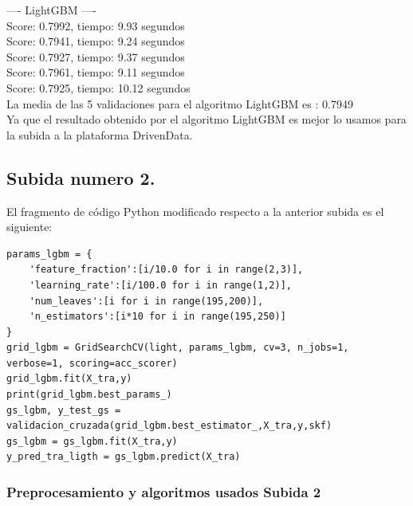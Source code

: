 	---- LightGBM ----					    \\		
	Score: 0.7992, tiempo:   9.93 segundos  \\
	Score: 0.7941, tiempo:   9.24 segundos  \\
	Score: 0.7927, tiempo:   9.37 segundos  \\
	Score: 0.7961, tiempo:   9.11 segundos  \\
	Score: 0.7925, tiempo:  10.12 segundos  \\
	
	La media de las 5 validaciones para el algoritmo LightGBM es : 0.7949 \\
	
	Ya que el resultado obtenido por el algoritmo LightGBM es mejor lo usamos para la subida a la plataforma DrivenData.
	
	
	\subsection[Subida numero 2]{Subida numero 2.}
	
	El fragmento de código Python modificado respecto a la anterior subida es el siguiente:
	
	\lstset{language=python}
	\begin{lstlisting}[frame=single]
params_lgbm = {
	'feature_fraction':[i/10.0 for i in range(2,3)],
	'learning_rate':[i/100.0 for i in range(1,2)],
	'num_leaves':[i for i in range(195,200)],
	'n_estimators':[i*10 for i in range(195,250)]
}
grid_lgbm = GridSearchCV(light, params_lgbm, cv=3, n_jobs=1, verbose=1, scoring=acc_scorer)
grid_lgbm.fit(X_tra,y)
print(grid_lgbm.best_params_)
gs_lgbm, y_test_gs = validacion_cruzada(grid_lgbm.best_estimator_,X_tra,y,skf)
gs_lgbm = gs_lgbm.fit(X_tra,y)
y_pred_tra_ligth = gs_lgbm.predict(X_tra)
	\end{lstlisting}
	
	
	\subsubsection[Preprocesamiento y algoritmos usados Subida 2]{Preprocesamiento y algoritmos usados Subida 2}
	
